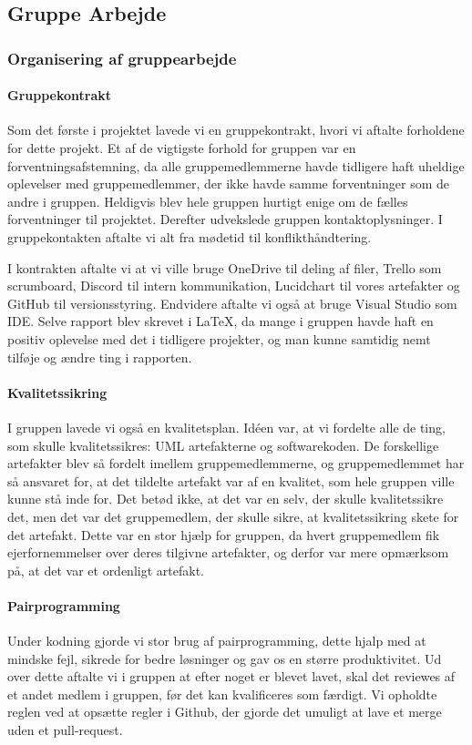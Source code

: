 \subsection{Gruppe Arbejde}
\subsubsection{Organisering af gruppearbejde}

\paragraph*{Gruppekontrakt}
Som det første i projektet lavede vi en gruppekontrakt, 
hvori vi aftalte forholdene for dette projekt.
Et af de vigtigste forhold for gruppen var en forventningsafstemning, da alle gruppemedlemmerne havde tidligere haft uheldige oplevelser med gruppemedlemmer, der ikke havde samme forventninger som de andre i gruppen.
Heldigvis blev hele gruppen hurtigt enige om de fælles forventninger til projektet.
Derefter udvekslede gruppen kontaktoplysninger.
I gruppekontakten aftalte vi alt fra mødetid til konflikthåndtering.


I kontrakten aftalte vi at vi ville bruge OneDrive til deling af filer, Trello som scrumboard, Discord til intern kommunikation, Lucidchart til vores artefakter og GitHub til versionsstyring. 
Endvidere aftalte vi også at bruge Visual Studio som IDE.
Selve rapport blev skrevet i \LaTeX, da mange i gruppen havde haft en positiv oplevelse med det i tidligere projekter, og man kunne samtidig nemt tilføje og ændre ting i rapporten.

\paragraph*{Kvalitetssikring}
I gruppen lavede vi også en kvalitetsplan.
Idéen var, at vi fordelte alle de ting, som skulle kvalitetssikres: UML artefakterne og softwarekoden.
De forskellige artefakter blev så fordelt imellem gruppemedlemmerne, og gruppemedlemmet har så ansvaret for, at det tildelte artefakt var af en kvalitet, som hele gruppen ville kunne stå inde for.
Det betød ikke, at det var en selv, der skulle kvalitetssikre det, men det var det gruppemedlem, der skulle sikre, at kvalitetssikring skete for det artefakt.
Dette var en stor hjælp for gruppen, da hvert gruppemedlem fik ejerfornemmelser over deres tilgivne artefakter, og derfor var mere opmærksom på, at det var et ordenligt artefakt.

\paragraph*{Pairprogramming}
Under kodning gjorde vi stor brug af pairprogramming, dette hjalp med at mindske fejl, sikrede for bedre løsninger og gav os en større produktivitet.
Ud over dette aftalte vi i gruppen at efter noget er blevet lavet, 
skal det reviewes af et andet medlem i gruppen, før det kan kvalificeres som færdigt. Vi opholdte reglen ved at opsætte regler i Github, der gjorde det umuligt at lave et merge uden et pull-request.

